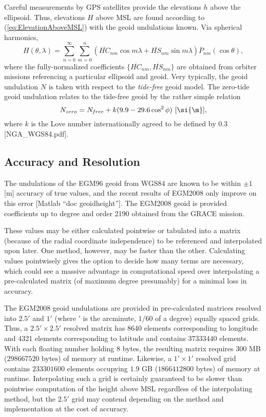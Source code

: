\documentclass[11pt,dvipsnames]{thesis}
\begin{document}
Careful measurements by GPS satellites provide the elevations $h$ above the ellipsoid. Thus, elevations $H$ above MSL are found according to (\ref{eq:ElevationAboveMSL}) with the geoid undulations known. Via spherical harmonics,
\begin{equation}
H(\theta, \lambda) = \sum_{n = 0}^\infty \sum_{m = 0}^n (\overline{H\!C}_{nm} \cos m\lambda + \overline{H\!S}_{nm} \sin m\lambda) \overline{P}_{nm}(\cos\theta), \label{eq:HeightAboveMSL}
\end{equation}
where the fully-normalized coefficients $\{\overline{H\!C}_{nm}, \overline{H\!S}_{nm}\}$ are obtained from orbiter missions referencing a particular ellipsoid and geoid.
Very typically, the geoid undulation $N$ is taken with respect to the \textit{tide-free} geoid model. The zero-tide geoid undulation relates to the tide-free geoid by the rather simple relation
\begin{equation}
N_{zero} = N_{\hspace{-0.1ex}f\hspace{-0.1ex}ree} + k(9.9 - 29.6 \cos^2\phi) \ [\si{\m}], 
\end{equation}
where $k$ is the Love number internationally agreed to be defined by 0.3 [NGA\_WGS84.pdf]. 


\subsection{Accuracy and Resolution}
The undulations of the EGM96 geoid from WGS84 are known to be within $\pm 1$ [\si{\m}] accuracy of true values, and the recent results of EGM2008 only improve on this error [Matlab ``doc geoidheight'']. The EGM2008 geoid is provided coefficients up to degree and order 2190 obtained from the GRACE mission. 

These values may be either calculated pointwise or tabulated into a matrix (because of the radial coordinate independence) to be referenced and interpolated upon later. One method, however, may be faster than the other. Calculating values pointwisely gives the option to decide how many terms are necessary, which could see a massive advantage in computational speed over interpolating a pre-calculated matrix (of maximum degree presumably) for a minimal loss in accuracy.

The EGM2008 geoid undulations are provided in pre-calculated matrices resolved into $2.5'$ and $1'$ (where $'$ is the arcminute, $1/60$ of a degree) equally spaced grids. Thus, a $2.5' \times 2.5'$ resolved matrix has 8640 elements corresponding to longitude and 4321 elements corresponding to latitude and contains $37333440$ elements. With each floating number holding $8$ bytes, the resulting matrix requires $300$ MB ($298667520$ bytes) of memory at runtime. Likewise, a $1' \times 1'$ resolved grid contains $233301600$ elements occupying $1.9$ GB ($1866412800$ bytes) of memory at runtime. Interpolating such a grid is certainly guaranteed to be slower than pointwise computation of the height above MSL regardless of the interpolating method, but the $2.5'$ grid may contend depending on the method and implementation at the cost of accuracy.
\end{document}
